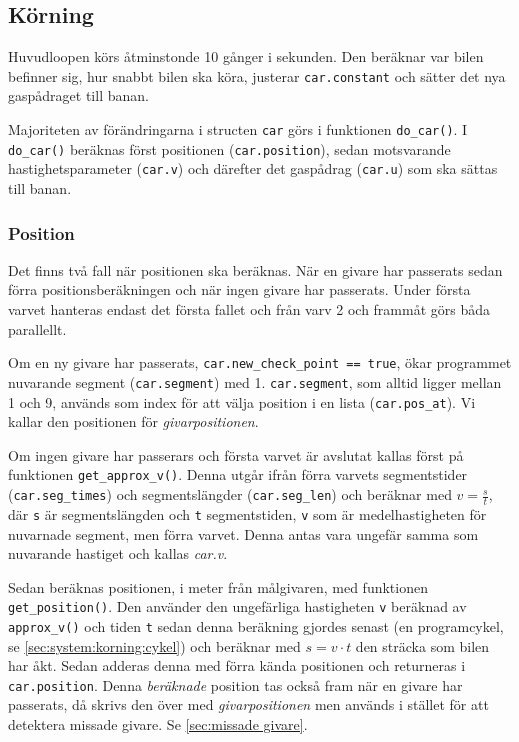 \subsection{Körning}
\label{sec:systembeskrivning:korning}

Huvudloopen körs åtminstonde 10 gånger i sekunden. Den beräknar var bilen
befinner sig, hur snabbt bilen ska köra, justerar \texttt{car.constant} och sätter det
nya gaspådraget till banan.

Majoriteten av förändringarna i structen \texttt{car} görs i funktionen \texttt{do\_car()}. 
I \texttt{do\_car()} beräknas  först positionen (\texttt{car.position}), 
sedan motsvarande hastighetsparameter (\texttt{car.v}) och därefter det gaspådrag 
(\texttt{car.u}) som ska sättas till banan.

\subsubsection{Position}
\label{sec:system:korning:position}
Det finns två fall när positionen ska beräknas. När en givare har passerats sedan förra positionsberäkningen och när ingen givare har passerats. Under första varvet hanteras endast det första fallet
och från varv 2 och frammåt görs båda parallellt. 

Om en ny givare har passerats, \texttt{car.new\_check\_point == true}, ökar
programmet nuvarande segment (\texttt{car.segment}) med 1. \texttt{car.segment}, som
alltid ligger mellan 1 och 9, används som index för att välja position i en
lista (\texttt{car.pos\_at}). Vi kallar den positionen för \emph{givarpositionen}.

Om ingen givare har passerars och första varvet är avslutat kallas först på funktionen \texttt{get\_approx\_v()}. Denna utgår ifrån
förra varvets segmentstider (\texttt{car.seg\_times}) och segmentslängder
(\texttt{car.seg\_len}) och beräknar med $v = \frac{s}{t}$, där \texttt{s} är segmentslängden och \texttt{t} segmentstiden, \texttt{v} som är medelhastigheten för nuvarnade
segment, men förra varvet. Denna antas vara ungefär samma som nuvarande
hastiget och kallas \emph{car.v}. 

Sedan beräknas positionen, i meter från målgivaren, med funktionen
\texttt{get\_position()}. Den använder den ungefärliga hastigheten \texttt{v} beräknad av
\texttt{approx\_v()} och tiden \texttt{t} sedan denna beräkning gjordes senast (en programcykel, se \ref{sec:system:korning:cykel})
och beräknar med $s = v \cdot t$ den sträcka som bilen har åkt. Sedan adderas denna
med förra kända positionen och returneras i \texttt{car.position}. Denna 
\emph{beräknade} position tas också fram när en givare har passerats, då skrivs den över med \emph{givarpositionen} men används i stället för att detektera missade givare. Se \ref{sec:missade givare}.

